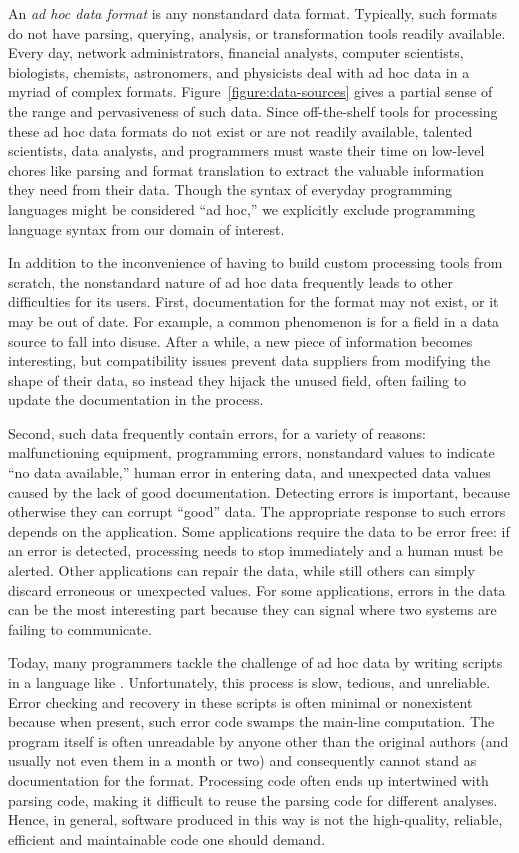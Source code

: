 An {\em ad hoc data format} is any nonstandard data format.  
Typically, such formats do not have parsing,
querying, analysis, or transformation tools readily available.
Every day, network administrators, financial analysts, computer
scientists, biologists, 
chemists, astronomers, and
physicists deal with ad hoc data in a myriad of complex formats.
Figure~\ref{figure:data-sources} gives a partial sense of the range
and pervasiveness of such data.  Since off-the-shelf
tools for processing these ad hoc data formats do not exist
or are not readily available, talented scientists, data analysts, and
programmers must waste their time 
on low-level chores like parsing and format translation
to extract the valuable information they need from their data.
Though the syntax of everyday programming languages
might be considered ``ad hoc,'' we explicitly exclude
programming language syntax from our domain of interest.

In addition to the inconvenience of having to build custom
processing tools from scratch, the nonstandard nature of ad hoc data
frequently leads to other difficulties for its users.
First, documentation for the format may not exist, or it may be out of
date.  For example, a common phenomenon is for a field in a data source to fall
into disuse.  After a while, a new piece of information becomes
interesting, but compatibility issues prevent data suppliers from
modifying the shape of their data, so instead they hijack the unused
field, often failing to update the documentation in the process.

Second, such data frequently contain errors, for a variety of reasons:
malfunctioning equipment, programming errors, nonstandard values to
indicate ``no data available,'' human error in entering data, and
unexpected data values caused by the lack of good documentation.
Detecting errors is important, because otherwise they can corrupt
``good'' data.  The appropriate response to such errors depends on the
application. Some applications require the data to be error free: if
an error is detected, processing needs to stop immediately and a human
must be alerted.  Other applications can repair the data, while still
others can simply discard erroneous or unexpected values.  For some
applications, errors in the data can be the most interesting part
because they can signal where two systems are failing to communicate.

Today, many programmers tackle the challenge of ad hoc data by writing
scripts in a language like \perl{}.  Unfortunately, this process is slow,
tedious, and unreliable.  Error checking and recovery in these scripts
is often minimal or nonexistent because when present, such error code
swamps the main-line computation.  The program itself is often
unreadable by anyone other than the original authors (and usually not
even them in a month or two) and consequently cannot stand as
documentation for the format.  Processing code often ends up
intertwined with parsing code, making it difficult to reuse the
parsing code for different analyses. Hence, in general, software
produced in this way is not the high-quality, reliable, efficient and
maintainable code one should demand.

